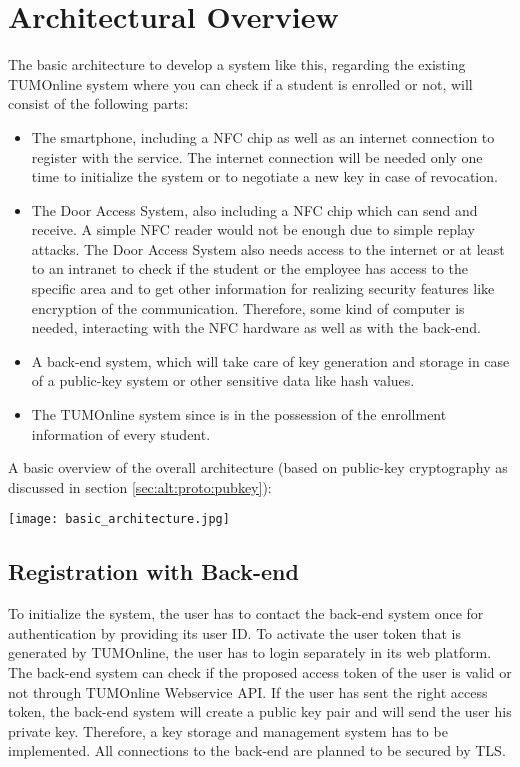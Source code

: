 \section{Architectural Overview}\label{sec:arch}

The basic architecture to develop a system like this, regarding the existing TUMOnline system where you can check if a student is enrolled or not, will consist of the following parts:

\begin{itemize}
\item The smartphone, including a NFC chip as well as an internet connection to register with the service. The internet connection will be needed only one time to initialize the system or to negotiate a new key in case of revocation.
\item The Door Access System, also including a NFC chip which can send and receive. A simple NFC reader would not be enough due to simple replay attacks. The Door Access System also needs access to the internet or at least to an intranet to check if the student or the employee has access to the specific area and to get other information for realizing security features like encryption of the communication. Therefore, some kind of computer is needed, interacting with the NFC hardware as well as with the back-end.
\item A back-end system, which will take care of key generation and storage in case of a public-key system or other sensitive data like hash values.

\item The TUMOnline system since is in the possession of the enrollment information of every student.
\end{itemize} 
%
A basic overview of the overall architecture (based on public-key cryptography as discussed in section \ref{sec:alt:proto:pubkey}): \newline
 \begin{center}
	\texttt{[image: basic\_architecture.jpg]}
\end{center}


\subsection{Registration with Back-end}
To initialize the system, the user has to contact the back-end system once for authentication by providing its user ID.
To activate the user token that is generated by TUMOnline, the user has to login separately in its web platform. 
The back-end system can check if the proposed access token of the user is valid or not through TUMOnline Webservice API.
If the user has sent the right access token, the back-end system will create a public key pair and will send the user his private key. Therefore, a key storage and management system has to be implemented.
All connections to the back-end are planned to be secured by TLS.



